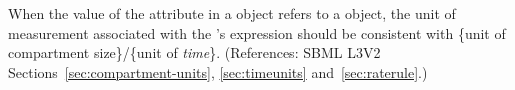 When the value of the attribute  in a \RateRule object
refers to a \Compartment object, the unit of measurement associated with
the \RateRule's  expression should be consistent with \{unit of
compartment size\}/\{unit of \emph{time}\}.  (References: SBML L3V2
Sections~\ref{sec:compartment-units}, \ref{sec:timeunits}
and~\ref{sec:raterule}.)
